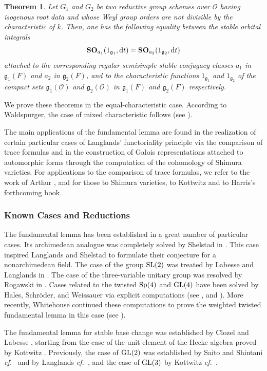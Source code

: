 \documentclass[12pt,english]{smfart}
\numberwithin{equation}{subsection}
\newtheorem{theorem}{Theorem}
\theoremstyle{remark}
\newcommand\calO{{\mathscr O}}
\newcommand\frakg{{\mathfrak g}}
\newcommand\GL{{\rm GL}}
\newcommand\SL{{\rm SL}}
\newcommand\Sp{{\rm Sp}}
\newcommand\cf{{\it cf.\ }}
\begin{document}
\begin{theorem}
Let $G_1$ and $G_2$ be two reductive group schemes over $\calO$ having isogenous root data and whose Weyl group orders are not divisible by the characteristic of $k$. Then, one has the following equality between the stable orbital integrals
$$
{\bf SO}_{a_1}(1_{\frakg_1},{\rm d}t)= {\bf SO}_{a_2}(1_{\frakg_2},{\rm d}t)
$$
attached to the corresponding regular semisimple stable conjugacy classes $a_1$ in $\frakg_1(F)$ and $a_2$ in $\frakg_2(F)$, and to the characteristic functions $1_{\frakg_1}$ and $1_{\frakg_2}$ of the compact sets $\frakg_1(\calO)$ and $\frakg_2(\calO)$ in $\frakg_1(F)$ and $\frakg_2(F)$ respectively.
\end{theorem}

We prove these theorems in the equal-characteristic case. According to Waldspurger, the case of mixed characteristic follows (see \cite{W}).

The main applications of the fundamental lemma are found in the realization of certain particular cases of Langlands' functoriality principle via the comparison of trace formulas and in the construction of Galois representations attached to automorphic forms through the computation of the cohomology of Shimura varieties. For applications to the comparison of trace formulas, we refer to the work of Arthur \cite{A}, and for those to Shimura varieties, to Kottwitz \cite{K-Shim} and to Harris's forthcoming book.

\subsubsection*{Known Cases and Reductions}
The fundamental lemma has been established in a great number of particular cases. Its archimedean analogue was completely solved by Shelstad in \cite{Sh}. This case inspired Langlands and Shelstad to formulate their conjecture for a nonarchimedean field. The case of the group $\SL(2)$ was treated by Labesse and Langlands in \cite{LL}. The case of the three-variable unitary group was resolved by Rogawski in \cite{Rog}. Cases related to the twisted $\Sp(4)$ and $\GL(4)$ have been solved by Hales, Schr\"oder, and Weissauer via explicit computations (see \cite{Hales-Sp(4)}, \cite{Sch} and \cite{We}). More recently, Whitehouse continued these computations to prove the weighted twisted fundamental lemma in this case (see \cite{Wh}).

The fundamental lemma for stable base change was established by Clozel \cite{C} and Labesse \cite{Lab}, starting from the case of the unit element of the Hecke algebra proved by Kottwitz \cite{K-unit}. Previously, the case of $\GL(2)$ was established by Saito and Shintani \cf \cite{Saito} and by Langlands \cf \cite{L-GL(2)}, and the case of $\GL(3)$ by Kottwitz \cf \cite{K-GL(3)}.
\end{document}

